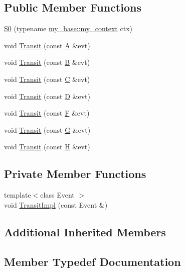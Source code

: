 \subsection*{Public Member Functions}
\begin{DoxyCompactItemize}
\item 
\mbox{\hyperlink{struct_s0_ae3f54303af3fc2ac9e5359ee234449df}{S0}} (typename \mbox{\hyperlink{struct_orthogonal0_a9e83fb13d36d05273364de4b3101f135}{my\+\_\+base\+::my\+\_\+context}} ctx)
\item 
void \mbox{\hyperlink{struct_s0_a381d03070f036ad7a0fe8ce5d6e077ec}{Transit}} (const \mbox{\hyperlink{struct_a}{A}} \&evt)
\item 
void \mbox{\hyperlink{struct_s0_a6e678f49b914efe49fb001bd7ed8e950}{Transit}} (const \mbox{\hyperlink{struct_b}{B}} \&evt)
\item 
void \mbox{\hyperlink{struct_s0_a013a8c49c337102e97536f2475579d87}{Transit}} (const \mbox{\hyperlink{struct_c}{C}} \&evt)
\item 
void \mbox{\hyperlink{struct_s0_a4fd4a4f8f2d4eed1d293bf74d09e145c}{Transit}} (const \mbox{\hyperlink{struct_d}{D}} \&evt)
\item 
void \mbox{\hyperlink{struct_s0_a6b0101df75c95bf575fd3292008a490f}{Transit}} (const \mbox{\hyperlink{struct_f}{F}} \&evt)
\item 
void \mbox{\hyperlink{struct_s0_aeb846cdc6476bd9321b0d02377ec4b6c}{Transit}} (const \mbox{\hyperlink{struct_g}{G}} \&evt)
\item 
void \mbox{\hyperlink{struct_s0_a50a83097d545d19abe3a1f51c21819d1}{Transit}} (const \mbox{\hyperlink{struct_h}{H}} \&evt)
\end{DoxyCompactItemize}
\subsection*{Private Member Functions}
\begin{DoxyCompactItemize}
\item 
{\footnotesize template$<$class Event $>$ }\\void \mbox{\hyperlink{struct_s0_a2668ab658c4d0e64fb9bf9881e4c72b6}{Transit\+Impl}} (const Event \&)
\end{DoxyCompactItemize}
\subsection*{Additional Inherited Members}


\subsection{Member Typedef Documentation}
\mbox{\label{struct_s0_ab6b77c5f26dece1481b89ddb3603750a}} 
